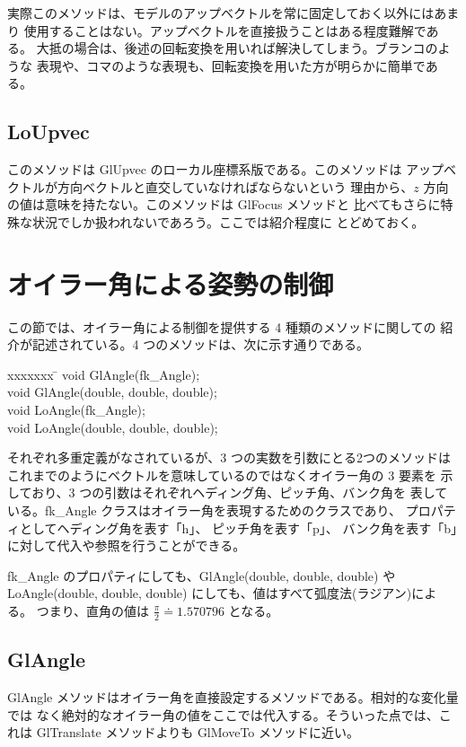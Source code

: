実際このメソッドは、モデルのアップベクトルを常に固定しておく以外にはあまり
使用することはない。アップベクトルを直接扱うことはある程度難解である。
大抵の場合は、後述の回転変換を用いれば解決してしまう。ブランコのような
表現や、コマのような表現も、回転変換を用いた方が明らかに簡単である。

\subsection{LoUpvec}
このメソッドは GlUpvec のローカル座標系版である。このメソッドは
アップベクトルが方向ベクトルと直交していなければならないという
理由から、\(z\) 方向の値は意味を持たない。このメソッドは GlFocus メソッドと
比べてもさらに特殊な状況でしか扱われないであろう。ここでは紹介程度に
とどめておく。

\section{オイラー角による姿勢の制御}
この節では、オイラー角による制御を提供する 4 種類のメソッドに関しての
紹介が記述されている。4 つのメソッドは、次に示す通りである。
\begin{bf}
\begin{tabbing}
xxxxxxx \= \kill
\> void GlAngle(fk\_Angle); \\
\> void GlAngle(double, double, double); \\
\> void LoAngle(fk\_Angle); \\
\> void LoAngle(double, double, double); \\
\end{tabbing}
\end{bf}
それぞれ多重定義がなされているが、3 つの実数を引数にとる2つのメソッドは
これまでのようにベクトルを意味しているのではなくオイラー角の 3 要素を
示しており、3 つの引数はそれぞれヘディング角、ピッチ角、バンク角を
表している。fk\_Angle クラスはオイラー角を表現するためのクラスであり、
プロパティとしてヘディング角を表す「h」、
ピッチ角を表す「p」、
バンク角を表す「b」に対して代入や参照を行うことができる。

fk\_Angle のプロパティにしても、GlAngle(double, double, double) や
LoAngle(double, double, double) にしても、値はすべて弧度法(ラジアン)による。
つまり、直角の値は \(\frac{\pi}{2} \doteq 1.570796\) となる。

\subsection{GlAngle}
GlAngle メソッドはオイラー角を直接設定するメソッドである。相対的な変化量では
なく絶対的なオイラー角の値をここでは代入する。そういった点では、これは
GlTranslate メソッドよりも GlMoveTo メソッドに近い。

